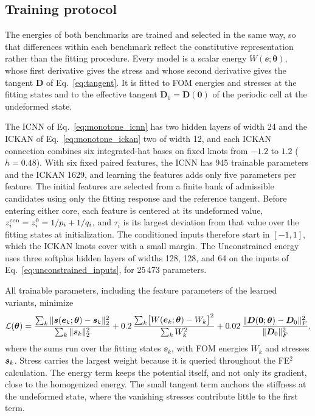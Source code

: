\subsection{Training protocol}
\label{sec:training_protocol}
The energies of both benchmarks are trained and selected in the same way, so that differences within each benchmark reflect the constitutive representation rather than the fitting procedure.  Every model is a scalar energy $W(\ee;\bm\theta)$, whose first derivative gives the stress and whose second derivative gives the tangent $\bm D$ of Eq.~\eqref{eq:tangent}.  It is fitted to FOM energies and stresses at the fitting states and to the effective tangent $\bm D_0=\bm D(\bm 0)$ of the periodic cell at the undeformed state.

The ICNN of Eq.~\eqref{eq:monotone_icnn} has two hidden layers of width 24 and the ICKAN of Eq.~\eqref{eq:monotone_ickan} two of width 12, and each ICKAN connection combines six integrated-hat bases on fixed knots from $-1.2$ to $1.2$ ($h=0.48$).  With six fixed paired features, the ICNN has 945 trainable parameters and the ICKAN 1629, and learning the features adds only five parameters per feature.  The initial features are selected from a finite bank of admissible candidates using only the fitting response and the reference tangent.  Before entering either core, each feature is centered at its undeformed value, $z_i^{\rm cen}=z_i^0=1/p_i+1/q_i$, and $\tau_i$ is its largest deviation from that value over the fitting states at initialization.  The conditioned inputs therefore start in $[-1,1]$, which the ICKAN knots cover with a small margin.  The Unconstrained energy uses three softplus hidden layers of widths 128, 128, and 64 on the inputs of Eq.~\eqref{eq:unconstrained_inputs}, for 25\,473 parameters.

All trainable parameters, including the feature parameters of the learned variants, minimize
\begin{equation}
 \mathcal L(\bm\theta)=
 \frac{\sum_k\|\bm s(\bm e_k;\bm\theta)-\bm s_k\|_2^2}{\sum_k\|\bm s_k\|_2^2}
 +0.2\,\frac{\sum_k\bigl[W(\bm e_k;\bm\theta)-W_k\bigr]^2}{\sum_k W_k^2}
 +0.02\,\frac{\|\bm D(\bm0;\bm\theta)-\bm D_0\|_F^2}{\|\bm D_0\|_F^2},
 \label{eq:training_loss}
\end{equation}
where the sums run over the fitting states $\ee_k$, with FOM energies $W_k$ and stresses $\bm s_k$.  Stress carries the largest weight because it is queried throughout the FE$^2$ calculation.  The energy term keeps the potential itself, and not only its gradient, close to the homogenized energy.  The small tangent term anchors the stiffness at the undeformed state, where the vanishing stresses contribute little to the first term.

